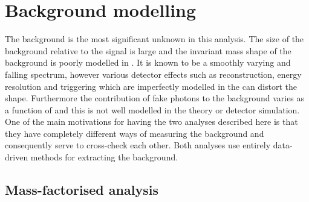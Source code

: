 \section{Background modelling}
\label{sec:background_model}

The background is the most significant unknown in this analysis. The size of the background relative to the signal is large and the invariant mass shape of the background is poorly modelled in \MC. It is known to be a smoothly varying and falling spectrum, however various detector effects such as reconstruction, energy resolution and triggering which are imperfectly modelled in the \MC can distort the shape. Furthermore the contribution of fake photons to the background varies as a function of \mgg and this is not well modelled in the theory or detector simulation. One of the main motivations for having the two analyses described here is that they have completely different ways of measuring the background and consequently serve to cross-check each other. Both analyses use entirely data-driven methods for extracting the background.  

\subsection{Mass-factorised analysis}
\label{sec:envelope}


